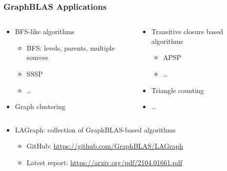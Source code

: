 \documentclass[xcolor=table,aspectratio=169]{beamer}
\begin{document}
\begin{frame}[fragile]
  \frametitle{GraphBLAS Applications}  
  \begin{columns}[t]
    \begin{column}{0.5\textwidth}
  \begin{itemize}
    \item BFS-like algorithms
    \begin{itemize}
      \item BFS: levels, parents, multiple sources
      \item SSSP
      \item \ldots
    \end{itemize}
    \item Graph clustering
  \end{itemize}
 \end{column}
\begin{column}{0.5\textwidth}
  \begin{itemize}
    \item Transitive closure based algorithms
    \begin{itemize}
      \item APSP      
      \item \ldots
    \end{itemize}
    \item Triangle counting    
    \item \ldots
  \end{itemize}
\end{column}
\end{columns}
\pause
\vspace{0.5cm}
\begin{itemize}
    \item LAGraph: collection of GraphBLAS-based algorithms  
  \begin{itemize}
    \item GitHub: \url{https://github.com/GraphBLAS/LAGraph}
    \item Latest report: \url{https://arxiv.org/pdf/2104.01661.pdf}
  \end{itemize}
\end{itemize}
\end{frame}

\newcommand\colR{\cellcolor{red!20}}
\newcommand\colB{\cellcolor{blue!20}}
\newcommand\colG{\cellcolor{green!20}}
\end{document}
